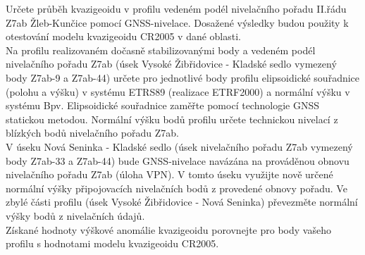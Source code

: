 \tab Určete průběh kvazigeoidu v profilu vedeném podél nivelačního pořadu II.řádu Z7ab Žleb-Kunčice pomocí GNSS-nivelace. Dosažené výsledky budou použity k otestování modelu kvazigeoidu CR2005 v dané oblasti.\\

Na profilu realizovaném dočasně stabilizovanými body a vedeném podél nivelačního pořadu Z7ab (úsek Vysoké Žibřidovice - Kladské sedlo vymezený body Z7ab-9 a Z7ab-44) určete pro jednotlivé body profilu elipsoidické souřadnice (polohu a výšku) v systému ETRS89 (realizace ETRF2000) a normální výšku v systému Bpv. Elipsoidické souřadnice zaměřte pomocí technologie GNSS statickou metodou. Normální výšku bodů profilu určete technickou nivelací z blízkých bodů nivelačního pořadu Z7ab.\\

V úseku Nová Seninka - Kladské sedlo (úsek nivelačního pořadu Z7ab vymezený body Z7ab-33 a Z7ab-44) bude GNSS-nivelace navázána na prováděnou obnovu nivelačního pořadu Z7ab (úloha VPN). V tomto úseku využijte nově určené normální výšky připojovacích nivelačních bodů z provedené obnovy pořadu. Ve zbylé části profilu (úsek Vysoké Žibřidovice - Nová Seninka) převezměte normální výšky bodů z nivelačních údajů.\\

Získané hodnoty výškové anomálie kvazigeoidu porovnejte pro body vašeho profilu s hodnotami modelu kvazigeoidu CR2005.\\